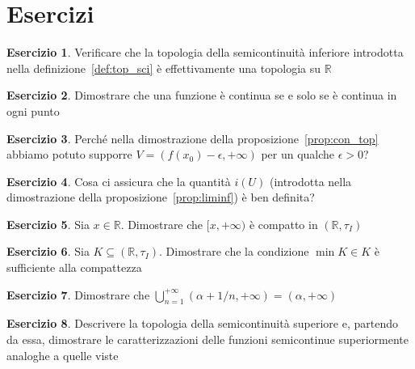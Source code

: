 \documentclass[a4paper, 11pt]{article}
\newcommand{\R}{\mathbb{R}}
\theoremstyle{plain} 	%
\theoremstyle{definition}
\newtheorem{es}{Esercizio}
\theoremstyle{remark}
\begin{document}
    \section*{Esercizi}
    \begin{es}
        Verificare che la topologia della semicontinuità inferiore introdotta nella definizione~\ref{def:top_sci} è effettivamente una topologia su $\mathbb{R}$ 
    \end{es}
    \begin{es}
        Dimostrare che una funzione è continua se e solo se è continua in ogni punto
    \end{es}
    \begin{es}
        Perché nella dimostrazione della proposizione~\ref{prop:con_top} abbiamo potuto supporre $V=(f(x_0)-\epsilon,+\infty)$ per un qualche $\epsilon>0$?  
    \end{es}
    \begin{es}
        Cosa ci assicura che la quantità $i(U)$ (introdotta nella dimostrazione della proposizione~\ref{prop:liminf}) è ben definita? 
    \end{es}
    \begin{es}
        Sia $x\in\R$. Dimostrare che $[x,+\infty)$ è compatto in $\left(\R,\tau_I\right)$
    \end{es}
    \begin{es}
        Sia $K\subseteq\left(\R,\tau_I\right)$. Dimostrare che la condizione $\min K\in K$ è sufficiente alla compattezza
    \end{es}
    \begin{es}
        Dimostrare che $\bigcup_{n=1}^{+\infty}(\alpha+1/n,+\infty)=\left(\alpha,+\infty\right)$
    \end{es}
    \begin{es}
        Descrivere la topologia della semicontinuità superiore e, partendo da essa, dimostrare le caratterizzazioni delle funzioni semicontinue superiormente analoghe a quelle viste
    \end{es}
\end{document}
